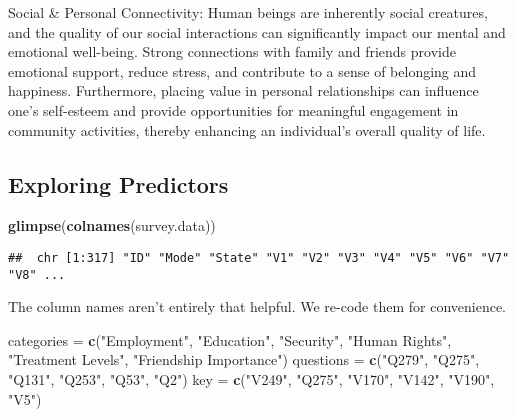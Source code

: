 \documentclass[
]{article}
\newenvironment{Shaded}{\begin{snugshade}}{\end{snugshade}}
\newcommand{\FunctionTok}[1]{\textcolor[rgb]{0.13,0.29,0.53}{\textbf{#1}}}
\newcommand{\NormalTok}[1]{#1}
\newcommand{\OtherTok}[1]{\textcolor[rgb]{0.56,0.35,0.01}{#1}}
\newcommand{\StringTok}[1]{\textcolor[rgb]{0.31,0.60,0.02}{#1}}
\begin{document}
Social \& Personal Connectivity: Human beings are inherently social
creatures, and the quality of our social interactions can significantly
impact our mental and emotional well-being. Strong connections with
family and friends provide emotional support, reduce stress, and
contribute to a sense of belonging and happiness. Furthermore, placing
value in personal relationships can influence one's self-esteem and
provide opportunities for meaningful engagement in community activities,
thereby enhancing an individual's overall quality of life.

\hypertarget{exploring-predictors}{%
\subsection{Exploring Predictors}\label{exploring-predictors}}

\begin{Shaded}
\begin{Highlighting}[]
\FunctionTok{glimpse}\NormalTok{(}\FunctionTok{colnames}\NormalTok{(survey.data))}
\end{Highlighting}
\end{Shaded}

\begin{verbatim}
##  chr [1:317] "ID" "Mode" "State" "V1" "V2" "V3" "V4" "V5" "V6" "V7" "V8" ...
\end{verbatim}

The column names aren't entirely that helpful. We re-code them for
convenience.

\begin{Shaded}
\begin{Highlighting}[]
\NormalTok{categories }\OtherTok{=} \FunctionTok{c}\NormalTok{(}\StringTok{"Employment"}\NormalTok{, }\StringTok{"Education"}\NormalTok{, }\StringTok{"Security"}\NormalTok{, }\StringTok{"Human Rights"}\NormalTok{, }\StringTok{"Treatment Levels"}\NormalTok{,  }\StringTok{"Friendship Importance"}\NormalTok{)}
\NormalTok{questions }\OtherTok{=} \FunctionTok{c}\NormalTok{(}\StringTok{"Q279"}\NormalTok{, }\StringTok{"Q275"}\NormalTok{, }\StringTok{"Q131"}\NormalTok{, }\StringTok{"Q253"}\NormalTok{, }\StringTok{"Q53"}\NormalTok{, }\StringTok{"Q2"}\NormalTok{)}
\NormalTok{key }\OtherTok{=} \FunctionTok{c}\NormalTok{(}\StringTok{"V249"}\NormalTok{, }\StringTok{"Q275"}\NormalTok{, }\StringTok{"V170"}\NormalTok{, }\StringTok{"V142"}\NormalTok{, }\StringTok{"V190"}\NormalTok{, }\StringTok{"V5"}\NormalTok{)}
\end{Highlighting}
\end{Shaded}
\end{document}
